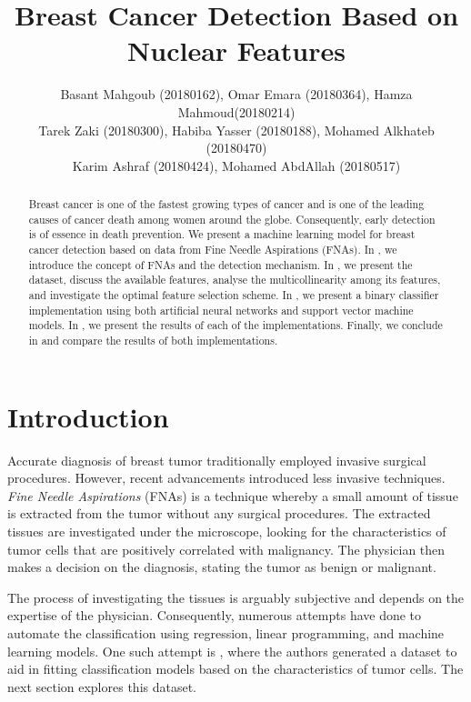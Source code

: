 \documentclass[twocolumn]{article}
\title{Breast Cancer Detection Based on Nuclear Features}
\author{
  Basant Mahgoub (20180162), Omar Emara (20180364), Hamza Mahmoud(20180214) \\
  Tarek Zaki (20180300), Habiba Yasser (20180188), Mohamed Alkhateb (20180470) \\
  Karim Ashraf (20180424), Mohamed AbdAllah (20180517)
}
\begin{document}
\maketitle

\begin{abstract}

  Breast cancer is one of the fastest growing types of cancer and is one of the
  leading causes of cancer death among women around the globe. Consequently,
  early detection is of essence in death prevention. We present a machine
  learning model for breast cancer detection based on data from Fine Needle
  Aspirations (FNAs). In , we introduce the concept of
  FNAs and the detection mechanism. In , we present the
  dataset, discuss the available features, analyse the multicollinearity among
  its features, and investigate the optimal feature selection scheme. In
  , we present a binary classifier implementation using
  both artificial neural networks and support vector machine models. In
  , we present the results of each of the implementations.
  Finally, we conclude in  and compare the results of both
  implementations.

\end{abstract}

\section{Introduction}
\label{sec:Introduction}

Accurate diagnosis of breast tumor traditionally employed invasive surgical
procedures. However, recent advancements introduced less invasive techniques.
\emph{Fine Needle Aspirations} (FNAs) is a technique whereby a small amount of
tissue is extracted from the tumor without any surgical procedures. The
extracted tissues are investigated under the microscope, looking for the
characteristics of tumor cells that are positively correlated with malignancy.
The physician then makes a decision on the diagnosis, stating the tumor as
benign or malignant.

The process of investigating the tissues is arguably subjective and depends on
the expertise of the physician. Consequently, numerous attempts have done to
automate the classification using regression, linear programming, and machine
learning models. One such attempt is \autocite{Street1993}, where the authors
generated a dataset to aid in fitting classification models based on the
characteristics of tumor cells. The next section explores this dataset.
\end{document}
